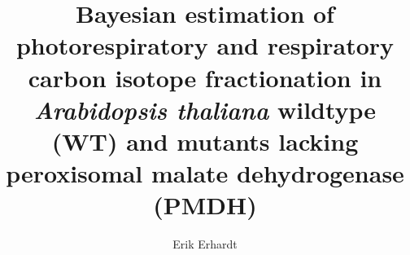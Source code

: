 \documentclass[12pt]{article}
\author{Erik Erhardt}
\title{Bayesian estimation of
  photorespiratory and respiratory carbon isotope fractionation in
  {\em Arabidopsis thaliana} wildtype (WT) and mutants lacking peroxisomal malate dehydrogenase (PMDH)}
\begin{document}
\newcommand{\data}[1]{\tilde{#1}} %
\newcommand{\sdatasig}[1]{\sigma_{#1}^2} %
\newcommand{\vdatasig}[1]{\Sigma_{#1}} %

\newcommand{\subctpr}{ctpr} %
\newcommand{\subctp} {ctp}  %
\newcommand{\subct}  {ct}   %
\newcommand{\subc}   {c}    %
\newcommand{\subt}   {t}    %


\newcommand{\sdotab}{\dot{a}_{\textrm{b}}} %
\newcommand{\sdota}{\dot{a}} %
\newcommand{\sdotaw}{\dot{a}_{\textrm{w}}} %
\newcommand{\sdotbs}{\dot{b}_{\textrm{s}}} %
\newcommand{\sdotb}{\dot{b}} %
\newcommand{\sdotRstd}{\dot{R}_\textrm{std 13C}} %
\newcommand{\sdotkappaHtw}{\dot{\kappa}_{\textrm{H}12}} %
\newcommand{\sdotkappaHth}{\dot{\kappa}_{\textrm{H}13}} %
\newcommand{\sdotkappaLtw}{\dot{\kappa}_{\textrm{L}12}} %
\newcommand{\sdotkappaLth}{\dot{\kappa}_{\textrm{L}13}} %
\newcommand{\vdotkappaHtw}{\vector{\dot{\kappa}}_{\textrm{H}}} %
\newcommand{\vdotkappaLtw}{\vector{\dot{\kappa}}_{\textrm{L}}} %
\newcommand{\sdotfthC}{\dot{f}_{\textrm{13C}}} %

\newcommand{\sDeltacomp}{\Delta_{\textrm{comp}\subct}} %
\newcommand{\sDeltaobs}{\Delta_{\textrm{obs}\subct}} %
\newcommand{\sDeltapred}{\Delta_{\textrm{pred}\subct}} %

\newcommand{\spa}{p_{\textrm{a}\subct}} %
\newcommand{\sps}{p_{\textrm{s}\subct}} %
\newcommand{\spi}{p_{\textrm{i}\subct}} %
\newcommand{\spc}{p_{\textrm{c}\subct}} %
\newcommand{\spatmL}{p_{\textrm{atm}\subctp}} %
\newcommand{\sallpressures}{\pi_{\subctp}}
 \newcommand{\sdatapatmL}{\data{p}_{\textrm{atm}\subctpr}} %
 \newcommand{\ssigpatmL}{\sdatasig{p_{\textrm{atm}}}} %

\newcommand{\sse}{e_{\subt}} %
\newcommand{\sseprime}{e_{\subt}^{\prime}} %
\newcommand{\sRd}{R_{\textrm{d}\subt}} %
 \newcommand{\sdataRd}{\data{R}_{\textrm{d}\subctp}} %
 \newcommand{\ssigRd}{\sdatasig{R_{\textrm{d}}}}%
\newcommand{\ssk}{k_{\subt}} %
 \newcommand{\sdatak}{\data{k}_{\subctp}} %
 \newcommand{\ssigk}{\sdatasig{k_{\subct}}} %
\newcommand{\ssf}{f_{\subct}} %
\newcommand{\ssfprime}{f_{\subct}^{\prime}} %
\newcommand{\sGammastar}{\Gamma^{\ast}_{\subt}} %
 \newcommand{\sdataGammastar}{\data{\Gamma}^{\ast}_{\subt}} %
 \newcommand{\ssigGammastar}{\sdatasig{\Gamma^{\ast}_{}}}%
\end{document}
